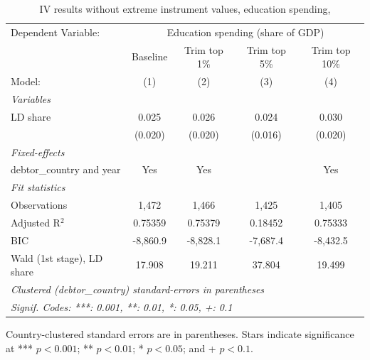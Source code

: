 
\begin{table}[htbp]
   \caption{\label{tab:results_iv_trim_top_educ_} IV results without extreme instrument values, education spending, }
   \centering
   \begin{tabular}{lcccc}
      \tabularnewline \midrule \midrule
      Dependent Variable: & \multicolumn{4}{c}{Education spending (share of GDP)}\\
                                 & Baseline & Trim top 1\%  & Trim top 5\%  & Trim top 10\% \\    
      Model:                     & (1)      & (2)           & (3)           & (4)\\  
      \midrule
      \emph{Variables}\\
      LD share                   & 0.025    & 0.026         & 0.024         & 0.030\\   
                                 & (0.020)  & (0.020)       & (0.016)       & (0.020)\\   
      \midrule
      \emph{Fixed-effects}\\
      debtor\_country and year   & Yes      & Yes           &               & Yes\\  
      \midrule
      \emph{Fit statistics}\\
      Observations               & 1,472    & 1,466         & 1,425         & 1,405\\  
      Adjusted R$^2$             & 0.75359  & 0.75379       & 0.18452       & 0.75333\\  
      BIC                        & -8,860.9 & -8,828.1      & -7,687.4      & -8,432.5\\  
      Wald (1st stage), LD share & 17.908   & 19.211        & 37.804        & 19.499\\  
      \midrule \midrule
      \multicolumn{5}{l}{\emph{Clustered (debtor\_country) standard-errors in parentheses}}\\
      \multicolumn{5}{l}{\emph{Signif. Codes: ***: 0.001, **: 0.01, *: 0.05, +: 0.1}}\\
   \end{tabular}
   
   \par \raggedright 
   Country-clustered standard errors are in parentheses. Stars indicate significance at *** $p < 0.001$; ** $p < 0.01$; * $p < 0.05$; and + $p < 0.1$.
\end{table}


